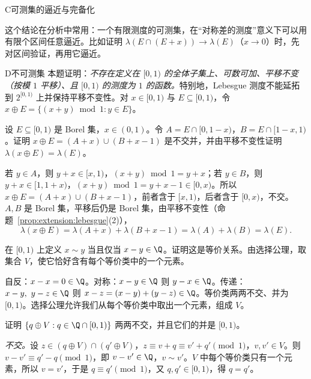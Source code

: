 \begin{probleme}{C}{可测集的逼近与完备化}
\begin{questions}
\begin{solution}
这个结论在分析中常用：一个有限测度的可测集，在“对称差的测度”意义下可以用有限个区间任意逼近。比如证明 $\lambda(E\cap(E+x))\to\lambda(E)$（$x\to0$）时，先对区间验证，再用它逼近。
\end{solution}
\end{questions}
\end{probleme}

\begin{probleme}{D}{不可测集}
本题证明：\emph{不存在定义在 $[0,1)$ 的全体子集上、可数可加、平移不变（按模 $1$ 平移）、且 $[0,1)$ 的测度为 $1$ 的函数。}特别地，Lebesgue 测度不能延拓到 $2^{[0,1)}$ 上并保持平移不变性。对 $x\in[0,1)$ 与 $E\subseteq[0,1)$，令 $x\oplus E=\{(x+y)\bmod1: y\in E\}$。
\begin{questions}
\item 设 $E\subseteq[0,1)$ 是 Borel 集，$x\in(0,1)$。令 $A=E\cap[0,1-x)$，$B=E\cap[1-x,1)$。证明 $x\oplus E=(A+x)\cup(B+x-1)$ 是不交并，并由平移不变性证明 $\lambda(x\oplus E)=\lambda(E)$。
\begin{solution}
若 $y\in A$，则 $y+x\in[x,1)$，$(x+y)\bmod1=y+x$；若 $y\in B$，则 $y+x\in[1,1+x)$，$(x+y)\bmod1=y+x-1\in[0,x)$。所以 $x\oplus E=(A+x)\cup(B+x-1)$，前者含于 $[x,1)$，后者含于 $[0,x)$，不交。$A,B$ 是 Borel 集，平移后仍是 Borel 集，由平移不变性（命题~\ref{prop:extension:lebesgue}(2)），
\[
\lambda(x\oplus E)=\lambda(A+x)+\lambda(B+x-1)=\lambda(A)+\lambda(B)=\lambda(E).
\]
\end{solution}
\item 在 $[0,1)$ 上定义 $x\sim y$ 当且仅当 $x-y\in\Q$。证明这是等价关系。由选择公理，取集合 $V$，使它恰好含有每个等价类中的一个元素。
\begin{solution}
自反：$x-x=0\in\Q$。对称：$x-y\in\Q$ 则 $y-x\in\Q$。传递：$x-y,\ y-z\in\Q$ 则 $x-z=(x-y)+(y-z)\in\Q$。等价类两两不交、并为 $[0,1)$。选择公理允许我们从每个等价类中取出一个元素，组成 $V$。
\end{solution}
\item 证明 $\{q\oplus V: q\in\Q\cap[0,1)\}$ 两两不交，并且它们的并是 $[0,1)$。
\begin{solution}
\emph{不交。}设 $z\in(q\oplus V)\cap(q'\oplus V)$，$z\equiv v+q\equiv v'+q'\pmod1$，$v,v'\in V$。则 $v-v'\equiv q'-q\pmod1$，即 $v-v'\in\Q$，$v\sim v'$。$V$ 中每个等价类只有一个元素，所以 $v=v'$，于是 $q\equiv q'\pmod1$，又 $q,q'\in[0,1)$，得 $q=q'$。


\end{solution}
\end{questions}
\end{probleme}
